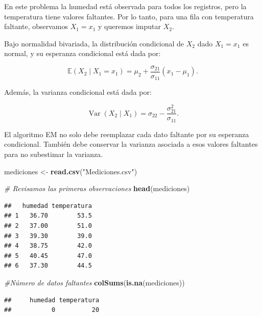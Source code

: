 \documentclass[
]{article}
\newenvironment{Shaded}{\begin{snugshade}}{\end{snugshade}}
\newcommand{\CommentTok}[1]{\textcolor[rgb]{0.56,0.35,0.01}{\textit{#1}}}
\newcommand{\FunctionTok}[1]{\textcolor[rgb]{0.13,0.29,0.53}{\textbf{#1}}}
\newcommand{\NormalTok}[1]{#1}
\newcommand{\OtherTok}[1]{\textcolor[rgb]{0.56,0.35,0.01}{#1}}
\newcommand{\StringTok}[1]{\textcolor[rgb]{0.31,0.60,0.02}{#1}}
\begin{document}
En este problema la humedad está observada para todos los registros,
pero la temperatura tiene valores faltantes. Por lo tanto, para una fila
con temperatura faltante, observamos \(X_1=x_1\) y queremos imputar
\(X_2\).

Bajo normalidad bivariada, la distribución condicional de \(X_2\) dado
\(X_1=x_1\) es normal, y su esperanza condicional está dada por:

\[
\mathbb{E}(X_2\mid X_1=x_1)
= \mu_2 + \frac{\sigma_{21}}{\sigma_{11}}(x_1-\mu_1).
\]

Además, la varianza condicional está dada por:

\[
\operatorname{Var}(X_2\mid X_1)
= \sigma_{22}-\frac{\sigma_{21}^2}{\sigma_{11}}.
\]

El algoritmo EM no solo debe reemplazar cada dato faltante por su
esperanza condicional. También debe conservar la varianza asociada a
esos valores faltantes para no subestimar la varianza.

\begin{Shaded}
\begin{Highlighting}[]
\NormalTok{mediciones }\OtherTok{\textless{}{-}} \FunctionTok{read.csv}\NormalTok{(}\StringTok{"Mediciones.csv"}\NormalTok{)}

\CommentTok{\# Revisamos las primeras observaciones}
\FunctionTok{head}\NormalTok{(mediciones)}
\end{Highlighting}
\end{Shaded}

\begin{verbatim}
##   humedad temperatura
## 1   36.70        53.5
## 2   37.00        51.0
## 3   39.30        39.0
## 4   38.75        42.0
## 5   40.45        47.0
## 6   37.30        44.5
\end{verbatim}

\begin{Shaded}
\begin{Highlighting}[]
\CommentTok{\#Número de datos faltantes}
\FunctionTok{colSums}\NormalTok{(}\FunctionTok{is.na}\NormalTok{(mediciones))}
\end{Highlighting}
\end{Shaded}

\begin{verbatim}
##     humedad temperatura 
##           0          20
\end{verbatim}
\end{document}

